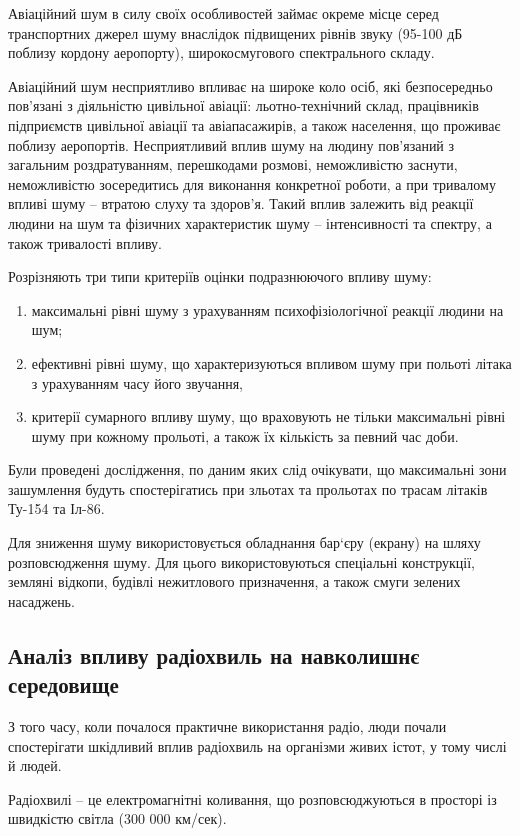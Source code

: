 Авіаційний шум в силу своїх особливостей займає окреме місце серед транспортних джерел шуму внаслідок підвищених рівнів звуку (95-100 дБ поблизу кордону аеропорту), широкосмугового спектрального складу. 

Авіаційний шум несприятливо впливає на широке коло осіб, які безпосередньо пов’язані з діяльністю цивільної авіації: льотно-технічний склад, працівників підприємств цивільної авіації та авіапасажирів, а також населення, що проживає поблизу аеропортів. Несприятливий вплив шуму на людину пов’язаний з загальним роздратуванням, перешкодами розмові, неможливістю заснути, неможливістю зосередитись для виконання конкретної роботи, а при тривалому впливі шуму – втратою слуху та здоров’я. Такий вплив залежить від реакції людини на шум та фізичних характеристик шуму – інтенсивності та спектру, а також тривалості впливу.

Розрізняють три типи критеріїв оцінки подразнюючого впливу шуму:
\begin{enumerate}
 \item максимальні рівні шуму з урахуванням психофізіологічної реакції людини на шум;
 \item ефективні рівні шуму, що характеризуються впливом шуму при польоті літака з урахуванням часу його звучання, 
 \item критерії сумарного впливу шуму, що враховують не тільки максимальні рівні шуму при кожному прольоті, а також їх кількість за певний час доби.
\end{enumerate}

Були проведені дослідження, по даним яких слід очікувати, що максимальні зони зашумлення будуть спостерігатись при зльотах та прольотах по трасам літаків Ту-154 та Іл-86. 

Для зниження шуму використовується обладнання бар`єру (екрану) на шляху розповсюдження шуму. Для цього використовуються спеціальні конструкції, земляні відкопи, будівлі нежитлового призначення, а також смуги зелених насаджень.

\subsection{Аналіз впливу радіохвиль на навколишнє середовище}

З того часу, коли почалося практичне використання радіо, люди почали спостерігати шкідливий вплив радіохвиль на організми живих істот, у тому числі й людей.

Радіохвилі -- це електромагнітні коливання, що розповсюджуються в просторі із швидкістю світла (300 000 км/сек).

